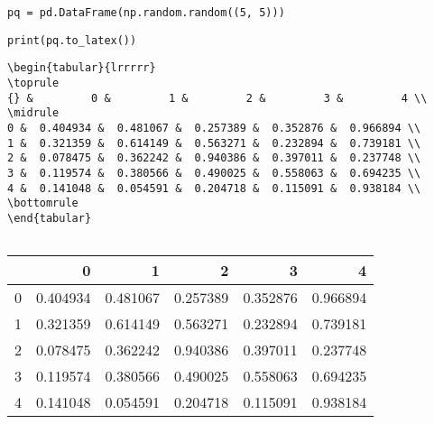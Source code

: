 \documentclass[11pt]{article}
\begin{document}
\begin{verbatim}
pq = pd.DataFrame(np.random.random((5, 5)))
\end{verbatim}

\begin{verbatim}
print(pq.to_latex())
\end{verbatim}

\begin{verbatim}
\begin{tabular}{lrrrrr}
\toprule
{} &         0 &         1 &         2 &         3 &         4 \\
\midrule
0 &  0.404934 &  0.481067 &  0.257389 &  0.352876 &  0.966894 \\
1 &  0.321359 &  0.614149 &  0.563271 &  0.232894 &  0.739181 \\
2 &  0.078475 &  0.362242 &  0.940386 &  0.397011 &  0.237748 \\
3 &  0.119574 &  0.380566 &  0.490025 &  0.558063 &  0.694235 \\
4 &  0.141048 &  0.054591 &  0.204718 &  0.115091 &  0.938184 \\
\bottomrule
\end{tabular}


\end{verbatim}

\begin{tabular}{lrrrrr}
\toprule
{} &         0 &         1 &         2 &         3 &         4 \\
\midrule
\hline
0 &  0.404934 &  0.481067 &  0.257389 &  0.352876 &  0.966894 \\
1 &  0.321359 &  0.614149 &  0.563271 &  0.232894 &  0.739181 \\
2 &  0.078475 &  0.362242 &  0.940386 &  0.397011 &  0.237748 \\
3 &  0.119574 &  0.380566 &  0.490025 &  0.558063 &  0.694235 \\
4 &  0.141048 &  0.054591 &  0.204718 &  0.115091 &  0.938184 \\
\hline
\bottomrule
\end{tabular}
\end{document}
